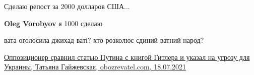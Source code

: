 \begin{itemize}
 
Сделаю репост за 2000 долларов США...

\begin{itemize}
 
\textbf{Oleg Vorobyov} я 1000 сделаю
\end{itemize}

 
вата оголосила джихад ваті? хто розколює єдиний ватний народ?

 

\href{https://news.obozrevatel.com/politics/kiev-sdavajsya-oppozitsioner-poyasnil-opasnost-stati-putina-pro-russkih-i-ukraintsah.htm}{Оппозиционер сравнил статью Путина с книгой Гитлера и указал на угрозу для Украины, Татьяна Гайжевская, obozrevatel.com, 18.07.2021}


\end{itemize}

